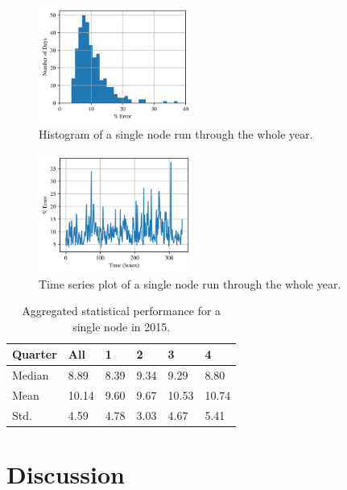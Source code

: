 \documentclass[sigconf]{acmart}
\begin{document}
\begin{figure}[h]
\includegraphics[width=0.45\textwidth]{fig_7.png}
\caption{Histogram of a single node run through the whole year.}
\label{fig:hist_single}
\end{figure}

\begin{figure}[h]
\includegraphics[width=0.45\textwidth]{fig_8.png}
\caption{Time series plot of a single node run through the whole year.}
\label{fig:time_single}
\end{figure}

\begin{table}[h]
\begin{tabular}{llllll}
\hline
Quarter & All   & 1    & 2    & 3     & 4     \\
\hline
Median  & 8.89  & 8.39 & 9.34 & 9.29  & 8.80  \\
Mean    & 10.14 & 9.60 & 9.67 & 10.53 & 10.74 \\
Std.    & 4.59  & 4.78 & 3.03 & 4.67  & 5.41 \\
\hline
\end{tabular}
\caption{Aggregated statistical performance for a single node in 2015.}
\label{tab:single}
\end{table}


\section{Discussion}
\label{sec:discussion}
\end{document}

